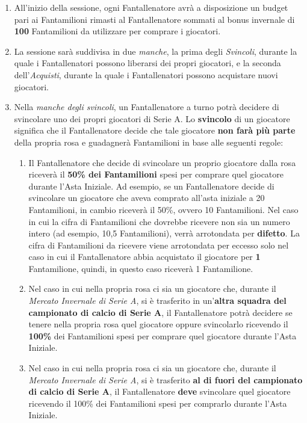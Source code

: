 \documentclass[12pt]{article}
\begin{document}
\begin{enumerate}
    \item All’inizio della sessione, ogni Fantallenatore avrà a disposizione un budget pari ai Fantamilioni rimasti al Fantallenatore sommati al bonus invernale di \textbf{100} Fantamilioni da utilizzare per comprare i giocatori.
    \item La sessione sarà suddivisa in due \textit{manche}, la prima degli \textit{Svincoli}, durante la quale i Fantallenatori possono liberarsi dei propri giocatori, e la seconda dell'\textit{Acquisti}, durante la quale i Fantallenatori possono acquistare nuovi giocatori.
    \item Nella \textit{manche degli svincoli}, un Fantallenatore a turno potrà decidere di svincolare uno dei propri giocatori di Serie A. Lo \textbf{svincolo} di un giocatore significa che il Fantallenatore decide che tale giocatore \textbf{non farà più parte} della propria rosa e guadagnerà Fantamilioni in base alle seguenti regole:
    \begin{enumerate}
        \item Il Fantallenatore che decide di svincolare un proprio giocatore dalla rosa riceverà il \textbf{50\% dei Fantamilioni} spesi per comprare quel giocatore durante l’Asta Iniziale. Ad esempio, se un Fantallenatore decide di svincolare un giocatore che aveva comprato all’asta iniziale a 20 Fantamilioni, in cambio riceverà il 50\%, ovvero 10 Fantamilioni. Nel caso in cui la cifra di Fantamilioni che dovrebbe ricevere non sia un numero intero (ad esempio, 10,5 Fantamilioni), verrà arrotondata per \textbf{difetto}. La cifra di Fantamilioni da ricevere viene arrotondata per eccesso solo nel caso in cui il Fantallenatore abbia acquistato il giocatore per \textbf{1} Fantamilione, quindi, in questo caso riceverà 1 Fantamilione. 
        \item Nel caso in cui nella propria rosa ci sia un giocatore che, durante il \textit{Mercato Invernale di Serie A}, si è trasferito in un’\textbf{altra squadra del campionato di calcio di Serie A}, il Fantallenatore potrà decidere se tenere nella propria rosa quel giocatore oppure svincolarlo ricevendo il \textbf{100\%} dei Fantamilioni spesi per comprare quel giocatore durante l’Asta Iniziale.
        \item Nel caso in cui nella propria rosa ci sia un giocatore che, durante il \textit{Mercato Invernale di Serie A}, si è trasferito \textbf{al di fuori del campionato di calcio di Serie A}, il Fantallenatore \textbf{deve} svincolare quel giocatore ricevendo il 100\% dei Fantamilioni spesi per comprarlo durante l’Asta Iniziale.

\end{enumerate}
\end{enumerate}
\end{document}
